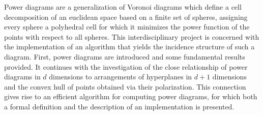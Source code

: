 Power diagrams are a generalization of Voronoi diagrams which define a cell decomposition of an euclidean space based on a finite set of spheres, assigning every sphere a polyhedral cell for which it minimizes the power function of the points with respect to all spheres.
This interdisciplinary project is concerned with the implementation of an algorithm that yields the incidence structure of such a diagram.
First, power diagrams are introduced and some fundamental results provided.
It continues with the investigation of the close relationship of power diagrams in $d$ dimensions to arrangements of hyperplanes in $d+1$ dimensions and the convex hull of points obtained via their polarization.
This connection gives rise to an efficient algorithm for computing power diagrams, for which both a formal definition and the description of an implementation is presented.
